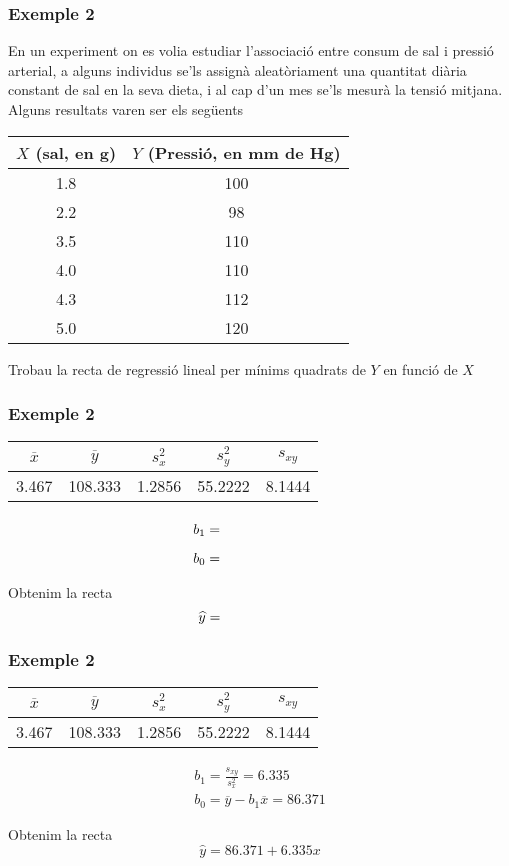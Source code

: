 \documentclass[12pt,t]{beamer}
\theoremstyle{plain}
\theoremstyle{definition}
\begin{document}
\begin{frame}
\frametitle{Exemple 2}
En un experiment on es volia estudiar l'associació entre consum de sal i pressió arterial, a alguns individus se'ls assignà aleatòriament una quantitat diària constant de sal en la seva dieta, i al cap d'un mes se'ls mesurà la tensió mitjana. Alguns resultats varen ser els següents
\begin{center}
\begin{tabular}{cc}
$X$ (sal, en g) 	& $Y$ (Pressió, en mm de Hg)\\ \hline
1.8 &	100\\
2.2 &	98\\
3.5 &	110\\
4.0 &	110\\
4.3 &	112\\
5.0 &	120\\
\end{tabular}
\end{center}
Trobau la recta de regressió lineal per mínims quadrats de $Y$ en funció de $X$

\end{frame}

\begin{frame}
\frametitle{Exemple 2}

\begin{center}
\begin{tabular}{ccccc}
$\overline{x}$ &  $\overline{y}$ & $s_x^2$ & $s_y^2$ & $s_{xy}$\\ \hline
3.467 & 108.333 & 1.2856 &55.2222 & 8.1444
\end{tabular}
\end{center}
\bigskip

$$
\begin{array}{l}
\displaystyle b_1 =\vphantom{\frac{s_{xy}}{s_x^2}}\hphantom{\overline{y}-b_1 \overline{x} = 86.371}\\[2ex]
\displaystyle b_0 =\hphantom{\overline{y}-b_1 \overline{x} = 86.371}
\end{array}
$$
\bigskip

Obtenim la recta
$$
\widehat{y}= \hphantom{86.371+6.335x}
$$

\end{frame}


\begin{frame}
\frametitle{Exemple 2}

\begin{center}
\begin{tabular}{ccccc}
$\overline{x}$ &  $\overline{y}$ & $s_x^2$ & $s_y^2$ & $s_{xy}$\\ \hline
3.467 & 108.333 & 1.2856 &55.2222 & 8.1444
\end{tabular}
\end{center}
\bigskip

$$
\begin{array}{l}
\displaystyle b_1 =\frac{s_{xy}}{s_x^2}=6.335\\[2ex]
\displaystyle b_0 = \overline{y}-b_1 \overline{x} = 86.371
\end{array}
$$
\bigskip

Obtenim la recta
$$
\widehat{y}= 86.371+6.335x
$$

\end{frame}
\end{document}
